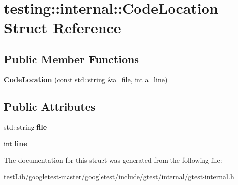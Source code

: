 \hypertarget{structtesting_1_1internal_1_1CodeLocation}{}\section{testing\+:\+:internal\+:\+:Code\+Location Struct Reference}
\label{structtesting_1_1internal_1_1CodeLocation}
\subsection*{Public Member Functions}
\begin{DoxyCompactItemize}
\item 
\mbox{\label{structtesting_1_1internal_1_1CodeLocation_a323a11851c81629d632c47b9b767b8ac}} 
{\bfseries Code\+Location} (const std\+::string \&a\+\_\+file, int a\+\_\+line)
\end{DoxyCompactItemize}
\subsection*{Public Attributes}
\begin{DoxyCompactItemize}
\item 
\mbox{\label{structtesting_1_1internal_1_1CodeLocation_a38118056ad3c11359920274e393bc6b3}} 
std\+::string {\bfseries file}
\item 
\mbox{\label{structtesting_1_1internal_1_1CodeLocation_a01c977c7e8834a05a6d6c40b0c416045}} 
int {\bfseries line}
\end{DoxyCompactItemize}


The documentation for this struct was generated from the following file\+:\begin{DoxyCompactItemize}
\item 
test\+Lib/googletest-\/master/googletest/include/gtest/internal/gtest-\/internal.\+h\end{DoxyCompactItemize}

